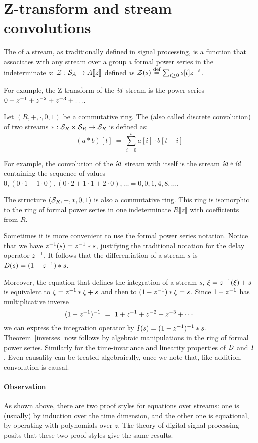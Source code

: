 \section{Z-transform and stream convolutions}\label{sec:ztransform}

\begin{definition}
The  of a stream, as traditionally defined in signal processing, 
is a function that associates with any stream over a group a formal power series in the 
indeterminate $z$: $\mathcal{Z}: \mathcal{S}_{A} 
\rightarrow A\llbracket z \rrbracket$ defined as $\mathcal{Z}(s) \stackrel{\textrm{\scriptsize def}}{=} \sum_{t \geq 0} s[t] z^{-t}$. 
\end{definition}

For example, the Z-transform of the $\mathit{id}$ stream is the power series 
$0 + z^{-1} + z^{-2} + z^{-3} + \ldots$.

\begin{definition}
Let $(R,+,\cdot,0,1)$ be a commutative ring.
The  (also called discrete convolution) of two streams 
$\ast : \mathcal{S}_{R} \times \mathcal{S}_{R} \rightarrow \mathcal{S}_{R}$  is defined as:
$$
(a\ast b)[t] ~=~ \sum_{i=0}^t a[i]\cdot b[t-i]
$$
\end{definition}

For example, the convolution of the $\mathit{id}$ stream with itself is the
stream $\mathit{id} \ast \mathit{id}$ containing the sequence of values 
$0, (0 \cdot 1 + 1 \cdot 0), (0 \cdot 2 + 1 \cdot 1 + 2 \cdot 0), \ldots =
0, 0, 1, 4, 8, \ldots$.

\begin{proposition}
The structure $(\mathcal{S}_{R},+,\ast,0,1)$ 
is also a commutative ring. This ring is isomorphic to the ring of
formal power series in one indeterminate $R\llbracket z \rrbracket$ with coefficients from $R$.
\end{proposition}


Sometimes it is more convenient to use the formal power series notation.
Notice that we have $z^{-1}(s) = z^{-1} \ast s$, 
justifying the traditional notation for the delay operator $z^{-1}$.
It follows that the differentiation of a stream 
$s$ is $\mathit{D}(s)=(1-z^{-1})\ast s$. 

Moreover, the equation that defines the integration of a stream $s$, $\xi=z^{-1}(\xi)+s$ is equivalent
to $\xi=z^{-1}\ast\xi + s$ and then to $(1-z^{-1})\ast\xi=s$. Since $1-z^{-1}$ has multiplicative inverse
$$
(1-z^{-1})^{-1} ~=~ 1+z^{-1}+z^{-2}+z^{-3}+\cdots
$$
we can express the integration operator by $\mathit{I}(s) = (1-z^{-1})^{-1}\ast s$. Theorem~\ref{inverses} now
follows by algebraic manipulations in the ring of formal power series. Similarly for the time-invariance
and linearity properties of $\mathit{D}$ and $\mathit{I}$. Even causality can be treated algebraically, once we note that,
like addition, convolution is causal.

\paragraph{Observation} As shown above, there are two proof styles
for equations over streams: one is (usually) by induction over the
time dimension,
and the other one is equational, by operating with
polynomials over $z$.  The theory of digital signal processing posits
that these two proof styles give the same results.
